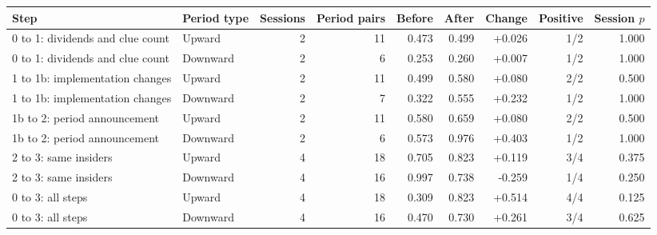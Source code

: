 \begin{tabular}{llrrrrrrr}
\toprule
Step & Period type & Sessions & Period pairs & Before & After & Change & Positive & Session $p$ \\
\midrule
0 to 1: dividends and clue count & Upward & 2 & 11 & 0.473 & 0.499 & +0.026 & 1/2 & 1.000 \\
0 to 1: dividends and clue count & Downward & 2 & 6 & 0.253 & 0.260 & +0.007 & 1/2 & 1.000 \\
1 to 1b: implementation changes & Upward & 2 & 11 & 0.499 & 0.580 & +0.080 & 2/2 & 0.500 \\
1 to 1b: implementation changes & Downward & 2 & 7 & 0.322 & 0.555 & +0.232 & 1/2 & 1.000 \\
1b to 2: period announcement & Upward & 2 & 11 & 0.580 & 0.659 & +0.080 & 2/2 & 0.500 \\
1b to 2: period announcement & Downward & 2 & 6 & 0.573 & 0.976 & +0.403 & 1/2 & 1.000 \\
2 to 3: same insiders & Upward & 4 & 18 & 0.705 & 0.823 & +0.119 & 3/4 & 0.375 \\
2 to 3: same insiders & Downward & 4 & 16 & 0.997 & 0.738 & -0.259 & 1/4 & 0.250 \\
0 to 3: all steps & Upward & 4 & 18 & 0.309 & 0.823 & +0.514 & 4/4 & 0.125 \\
0 to 3: all steps & Downward & 4 & 16 & 0.470 & 0.730 & +0.261 & 3/4 & 0.625 \\
\bottomrule
\end{tabular}
